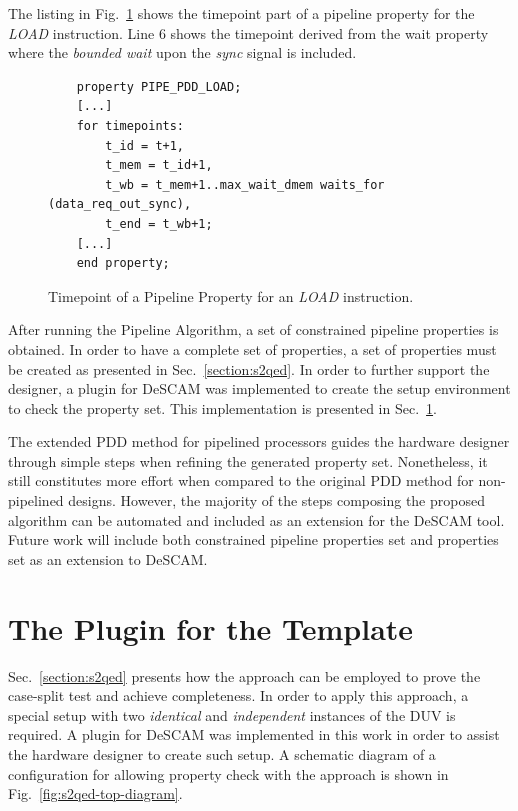The listing in Fig.~\ref{fig:load-ptt-merg-algorithm} shows the timepoint part of a pipeline property for the \textit{LOAD} instruction. Line 6 shows the timepoint derived from the wait property where the \textit{bounded wait} upon the \textit{sync} signal is included. 

\begin{figure}[htb!]
    \begin{lstlisting}
    property PIPE_PDD_LOAD;
    [...]
    for timepoints:
        t_id = t+1,
        t_mem = t_id+1,
        t_wb = t_mem+1..max_wait_dmem waits_for (data_req_out_sync),
        t_end = t_wb+1;
    [...]
    end property;\end{lstlisting}
    \caption{Timepoint of a Pipeline Property for an \textit{LOAD} instruction.}
    \label{fig:load-ptt-merg-algorithm}
\end{figure}

After running the Pipeline Algorithm, a set of constrained pipeline properties is obtained. In order to have a complete set of properties, a set of \SSQED{} properties must be created as presented in Sec.~\ref{section:s2qed}. In order to further support the designer, a plugin for DeSCAM was implemented to create the setup environment to check the \SSQED{} property set. This implementation is presented in Sec.~\ref{section:plugio-s2qed-top}.

The extended PDD method for pipelined processors guides the hardware designer through simple steps when refining the generated property set. Nonetheless, it still constitutes more effort when compared to the original PDD method for non-pipelined designs. However, the majority of the steps composing the proposed algorithm can be automated and included as an extension for the DeSCAM tool. Future work will include both constrained pipeline properties set and \SSQED{} properties set as an extension to DeSCAM.

\section{The Plugin for the \SSQED{} Template}
\label{section:plugio-s2qed-top}

Sec.~\ref{section:s2qed} presents how the \SSQED{} approach can be employed to prove the case-split test and achieve completeness. In order to apply this approach, a special setup with two \textit{identical} and \textit{independent} instances of the DUV is required. A plugin for DeSCAM was implemented in this work in order to assist the hardware designer to create such setup. A schematic diagram of a configuration for allowing property check with the \SSQED{} approach is shown in Fig.~\ref{fig:s2qed-top-diagram}. 

